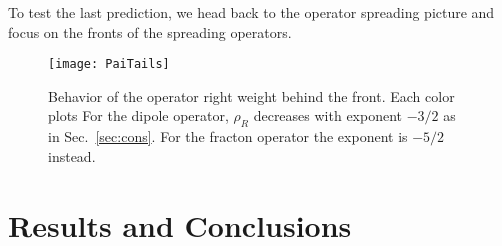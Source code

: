 \documentclass[a4paper,12pt]{article}
\begin{document}
To test the last prediction, we head back to the operator spreading picture and focus on the fronts of the spreading operators. 

\begin{figure}
	\centering
	\texttt{[image: PaiTails]}
	\caption{Behavior of the operator right weight behind the front. Each color plots For the dipole operator, $\rho_R$ decreases with exponent $-3/2$ as in Sec.~\ref{sec:cons}. For the fracton operator the exponent is $-5/2$ instead. }
	\label{fig:PaiTails}
\end{figure}


\section{Results and Conclusions} \label{sec:conc}

\nocite{apsrev41Control}

\end{document}
